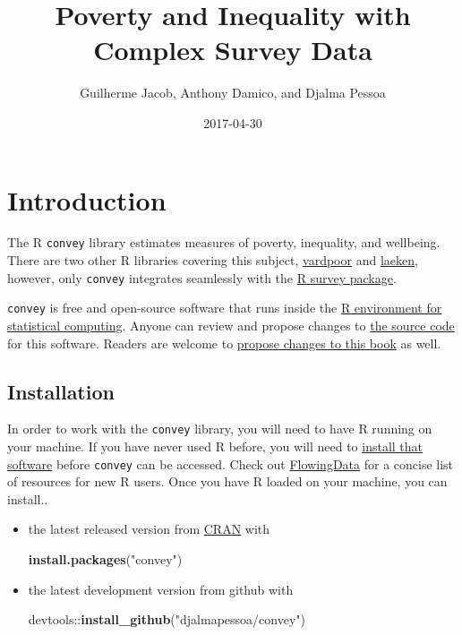 \documentclass[]{book}
\title{Poverty and Inequality with Complex Survey Data}
\author{Guilherme Jacob, Anthony Damico, and Djalma Pessoa}
\date{2017-04-30}
\newenvironment{Shaded}{\begin{snugshade}}{\end{snugshade}}
\newcommand{\KeywordTok}[1]{\textcolor[rgb]{0.13,0.29,0.53}{\textbf{{#1}}}}
\newcommand{\StringTok}[1]{\textcolor[rgb]{0.31,0.60,0.02}{{#1}}}
\newcommand{\NormalTok}[1]{{#1}}
\begin{document}
\maketitle

{
\setcounter{tocdepth}{1}
\tableofcontents
}
\chapter{Introduction}\label{introduction}

The R \texttt{convey} library estimates measures of poverty, inequality,
and wellbeing. There are two other R libraries covering this subject,
\href{https://CRAN.R-project.org/package=vardpoor}{vardpoor} and
\href{https://CRAN.R-project.org/package=laeken}{laeken}, however, only
\texttt{convey} integrates seamlessly with the
\href{https://CRAN.R-project.org/package=survey}{R survey package}.

\texttt{convey} is free and open-source software that runs inside the
\href{https://www.r-project.org/}{R environment for statistical
computing}. Anyone can review and propose changes to
\href{https://github.com/DjalmaPessoa/convey}{the source code} for this
software. Readers are welcome to
\href{https://github.com/guilhermejacob/context/}{propose changes to
this book} as well.

\section{Installation}\label{install}

In order to work with the \texttt{convey} library, you will need to have
R running on your machine. If you have never used R before, you will
need to \href{https://www.r-project.org/}{install that software} before
\texttt{convey} can be accessed. Check out
\href{http://flowingdata.com/2012/06/04/resources-for-getting-started-with-r/}{FlowingData}
for a concise list of resources for new R users. Once you have R loaded
on your machine, you can install..

\begin{itemize}
\item
  the latest released version from
  \href{https://CRAN.R-project.org/package=convey}{CRAN} with

\begin{Shaded}
\begin{Highlighting}[]
\KeywordTok{install.packages}\NormalTok{(}\StringTok{"convey"}\NormalTok{)}
\end{Highlighting}
\end{Shaded}
\item
  the latest development version from github with

\begin{Shaded}
\begin{Highlighting}[]
\NormalTok{devtools::}\KeywordTok{install_github}\NormalTok{(}\StringTok{"djalmapessoa/convey"}\NormalTok{)}
\end{Highlighting}
\end{Shaded}
\end{itemize}
\end{document}

